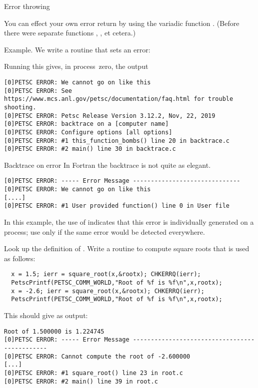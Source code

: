  {Error throwing}

You can effect your own error return by using
the variadic function .
(Before  there were separate functions
, , et cetera.)

Example. We write a routine that sets an error:

Running this gives, in process~zero, the output
\begin{verbatim}
[0]PETSC ERROR: We cannot go on like this
[0]PETSC ERROR: See https://www.mcs.anl.gov/petsc/documentation/faq.html for trouble shooting.
[0]PETSC ERROR: Petsc Release Version 3.12.2, Nov, 22, 2019
[0]PETSC ERROR: backtrace on a [computer name]
[0]PETSC ERROR: Configure options [all options]
[0]PETSC ERROR: #1 this_function_bombs() line 20 in backtrace.c
[0]PETSC ERROR: #2 main() line 30 in backtrace.c  
\end{verbatim}

\begin{fortrannote}{Backtrace on error}
  In Fortran the backtrace is not quite as elegant.
\begin{verbatim}
[0]PETSC ERROR: ----- Error Message ------------------------------
[0]PETSC ERROR: We cannot go on like this
[....]
[0]PETSC ERROR: #1 User provided function() line 0 in User file
\end{verbatim}
\end{fortrannote}

\begin{remark}
  In this example, the use of  indicates
  that this error is individually generated on a process;
  use  only if the same error would
  be detected everywhere.
\end{remark}

\begin{exercise}
  Look up the definition of .
  Write a routine to compute square roots that is used as follows:
\begin{lstlisting}
  x = 1.5; ierr = square_root(x,&rootx); CHKERRQ(ierr);
  PetscPrintf(PETSC_COMM_WORLD,"Root of %f is %f\n",x,rootx);
  x = -2.6; ierr = square_root(x,&rootx); CHKERRQ(ierr);
  PetscPrintf(PETSC_COMM_WORLD,"Root of %f is %f\n",x,rootx);
\end{lstlisting}
This should give as output:
\begin{verbatim}
Root of 1.500000 is 1.224745
[0]PETSC ERROR: ----- Error Message ----------------------------------------------
[0]PETSC ERROR: Cannot compute the root of -2.600000
[...]
[0]PETSC ERROR: #1 square_root() line 23 in root.c
[0]PETSC ERROR: #2 main() line 39 in root.c
\end{verbatim}

\end{exercise}

